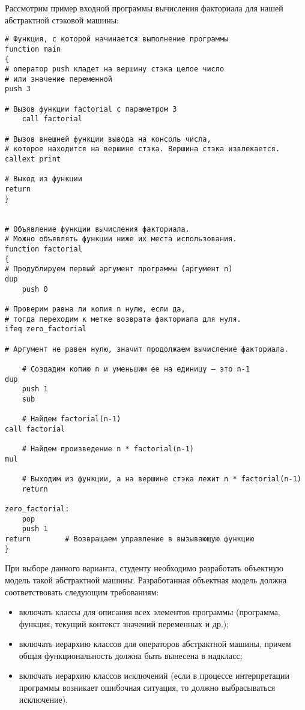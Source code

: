 \documentclass[a4paper,12pt]{article}
\begin{document}
Рассмотрим пример входной программы вычисления факториала для нашей
абстрактной стэковой машины:

\begin{verbatim}
# Функция, с которой начинается выполнение программы
function main
{
# оператор push кладет на вершину стэка целое число
# или значение переменной
push 3

# Вызов функции factorial с параметром 3
    call factorial   

# Вызов внешней функции вывода на консоль числа,
# которое находится на вершине стэка. Вершина стэка извлекается.
callext print

# Выход из функции
return
}


# Объявление функции вычисления факториала.
# Можно объявлять функции ниже их места использования.
function factorial
{
# Продублируем первый аргумент программы (аргумент n)
dup 
    push 0

# Проверим равна ли копия n нулю, если да,
# тогда переходим к метке возврата факториала для нуля.
ifeq zero_factorial

# Аргумент не равен нулю, значит продолжаем вычисление факториала.
    
    # Создадим копию n и уменьшим ее на единицу – это n-1
dup
    push 1
    sub

    # Найдем factorial(n-1)
call factorial
   
    # Найдем произведение n * factorial(n-1)
mul

    # Выходим из функции, а на вершине стэка лежит n * factorial(n-1)
    return

zero_factorial:
    pop
    push 1        
return        # Возвращаем управление в вызывающую функцию
}
\end{verbatim}

При выборе данного варианта, студенту необходимо разработать объектную
модель такой абстрактной машины. Разработанная объектная модель должна
соответствовать следующим требованиям:

\begin{itemize}
\item включать классы для описания всех элементов программы
  (программа, функция, текущий контекст значений переменных и др.);
\item включать иерархию классов для операторов абстрактной машины,
  причем общая функциональность должна быть вынесена в надкласс;
\item включать иерархию классов иcключений (если в процессе
  интерпретации программы возникает ошибочная ситуация, то должно
  выбрасываться исключение).
\end{itemize}
\end{document}
